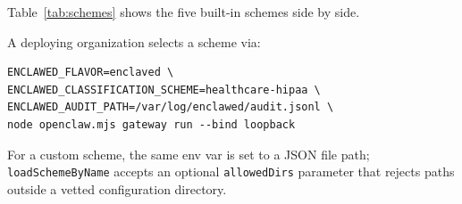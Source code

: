 \documentclass[11pt]{article}
\begin{document}
Table~\ref{tab:schemes} shows the five built-in schemes side by side.

\begin{table}[t]
  \centering
  \footnotesize
  \setlength{\tabcolsep}{3pt}
  \caption{Built-in classification schemes (column headers are scheme
    ids; rank-4 of \texttt{healthcare-hipaa} is RESEARCH-EMBARGOED,
    abbreviated for table fit). Aliases such as \texttt{q-cleared}
    $\equiv$ rank 4 of \texttt{us-government} are accepted by
    \texttt{parse()} and by manifest \texttt{clearance} validation.}
  \label{tab:schemes}
\end{table}

A deploying organization selects a scheme via:

\begin{verbatim}
ENCLAWED_FLAVOR=enclaved \
ENCLAWED_CLASSIFICATION_SCHEME=healthcare-hipaa \
ENCLAWED_AUDIT_PATH=/var/log/enclawed/audit.jsonl \
node openclaw.mjs gateway run --bind loopback
\end{verbatim}

For a custom scheme, the same env var is set to a JSON file path;
\texttt{loadSchemeByName} accepts an optional \texttt{allowedDirs}
parameter that rejects paths outside a vetted configuration directory.

\end{document}
